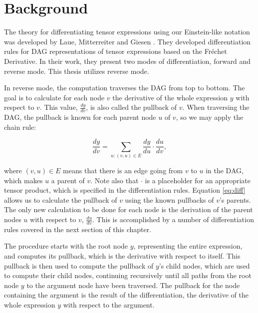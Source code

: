 \documentclass[12pt, a4paper]{report}
\begin{document}
\section{Background}
The theory for differentiating tensor expressions using our Einstein-like notation was developed by Laue, Mitterreiter and Giesen \cite{tensorpaper}.
They developed differentiation rules for DAG representations of tensor expressions based on the Fr\'{e}chet Derivative.
In their work, they present two modes of differentiation, forward and reverse mode.
This thesis utilizes reverse mode.

In reverse mode, the computation traverses the DAG from top to bottom.
The goal is to calculate for each node $v$ the derivative of the whole expression $y$ with respect to $v$.
This value, $\frac{dy}{dv}$, is also called the pullback of $v$.
When traversing the DAG, the pullback is known for each parent node $u$ of $v$, so we may apply the chain rule:

\begin{equation}
    \frac{dy}{dv} = \sum_{u: (v,u) \in E} \frac{dy}{du} \cdot \frac{du}{dv},
    \label{eq:diff}
\end{equation}

where $(v,u) \in E$ means that there is an edge going from $v$ to $u$ in the DAG, which makes $u$ a parent of $v$. 
Note also that $\cdot$ is a placeholder for an appropriate tensor product, which is specified in the differentiation rules. 
Equation \ref{eq:diff} allows us to calculate the pullback of $v$ using the known pullbacks of $v$'s parents.
The only new calculation to be done for each node is the derivation of the parent nodes $u$ with respect to $v$, $\frac{du}{dv}$.
This is accomplished by a number of differentiation rules covered in the next section of this chapter.

The procedure starts with the root node $y$, representing the entire expression, and computes its pullback, which is the derivative with respect to itself.
This pullback is then used to compute the pullback of $y$'s child nodes, which are used to compute their child nodes, continuing recursively until all paths from the root node $y$ to the argument node have been traversed.
The pullback for the node containing the argument is the result of the differentiation, the derivative of the whole expression $y$ with respect to the argument.
\end{document}
